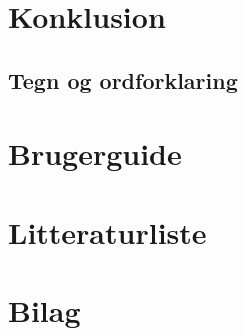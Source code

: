 \documentclass[12pt,oneside,a4paper,english]{article}
\begin{document}
\newpage
\section{Konklusion}

\thispagestyle{fancy}

\newpage
\begin{flushleft}
\section{Tegn og ordforklaring}
\end{flushleft}

\thispagestyle{fancy}

\newpage
\section{Brugerguide}

\thispagestyle{fancy}

\newpage
\section{Litteraturliste}

\newpage
\section{Bilag}

\label{endOfDoc}
\end{document}
